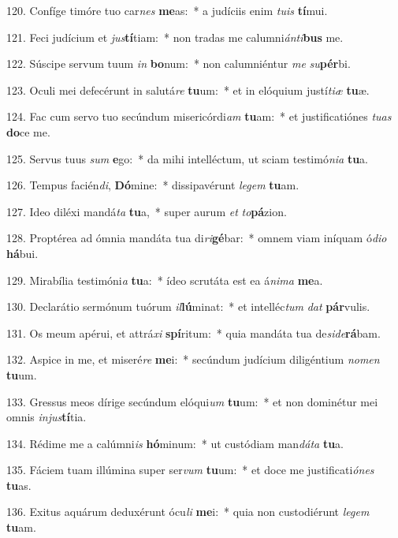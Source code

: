 120. Confíge timóre tuo car\textit{nes} \textbf{me}as:~*  a judíciis enim \textit{tu}\textit{is} \textbf{tí}mui.\

121. Feci judícium et \textit{jus}\textbf{tí}tiam:~*  non tradas me calumni\textit{án}\textit{ti}\textbf{bus} me.\

122. Súscipe servum tuum \textit{in} \textbf{bo}num:~*  non calumniéntur \textit{me} \textit{su}\textbf{pér}bi.\

123. Oculi mei defecérunt in salutá\textit{re} \textbf{tu}um:~*  et in elóquium justí\textit{ti}\textit{æ} \textbf{tu}æ.\

124. Fac cum servo tuo secúndum misericórdi\textit{am} \textbf{tu}am:~*  et justificatiónes \textit{tu}\textit{as} \textbf{do}ce me.\

125. Servus tuus \textit{sum} \textbf{e}go:~*  da mihi intelléctum, ut sciam testimó\textit{ni}\textit{a} \textbf{tu}a.\

126. Tempus facién\textit{di}, \textbf{Dó}mine:~*  dissipavérunt \textit{le}\textit{gem} \textbf{tu}am.\

127. Ideo diléxi mandá\textit{ta} \textbf{tu}a,~*  super aurum \textit{et} \textit{to}\textbf{pá}zion.\

128. Proptérea ad ómnia mandáta tua di\textit{ri}\textbf{gé}bar:~*  omnem viam iníquam ó\textit{di}\textit{o} \textbf{há}bui.\

129. Mirabília testimóni\textit{a} \textbf{tu}a:~*  ídeo scrutáta est ea á\textit{ni}\textit{ma} \textbf{me}a.\

130. Declarátio sermónum tuórum \textit{il}\textbf{lú}minat:~*  et intelléc\textit{tum} \textit{dat} \textbf{pár}vulis.\

131. Os meum apérui, et attrá\textit{xi} \textbf{spí}ritum:~*  quia mandáta tua de\textit{si}\textit{de}\textbf{rá}bam.\

132. Aspice in me, et miseré\textit{re} \textbf{me}i:~*  secúndum judícium diligéntium \textit{no}\textit{men} \textbf{tu}um.\

133. Gressus meos dírige secúndum elóqui\textit{um} \textbf{tu}um:~*  et non dominétur mei omnis \textit{in}\textit{jus}\textbf{tí}tia.\

134. Rédime me a calúmni\textit{is} \textbf{hó}minum:~*  ut custódiam man\textit{dá}\textit{ta} \textbf{tu}a.\

135. Fáciem tuam illúmina super ser\textit{vum} \textbf{tu}um:~*  et doce me justificati\textit{ó}\textit{nes} \textbf{tu}as.\

136. Exitus aquárum deduxérunt ócu\textit{li} \textbf{me}i:~*  quia non custodiérunt \textit{le}\textit{gem} \textbf{tu}am.\

